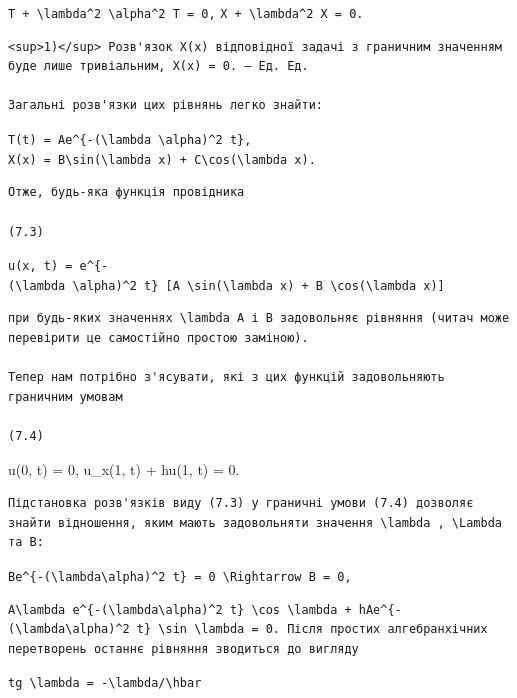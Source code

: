 \documentclass[
  ukrainian,
]{article}
\begin{document}
\texttt{T\textquotesingle{}\ +\ \textbackslash{}lambda\^{}2\ \textbackslash{}alpha\^{}2\ T\ =\ 0,}
\texttt{X\textquotesingle{}\ +\ \textbackslash{}lambda\^{}2\ X\ =\ 0.}

\begin{verbatim}
<sup>1)</sup> Розв'язок X(x) відповідної задачі з граничним значенням буде лише тривіальним, X(x) = 0. — Ед. Ед.

Загальні розв'язки цих рівнянь легко знайти:
\end{verbatim}

\texttt{T(t)\ =\ Ae\^{}\{-(\textbackslash{}lambda\ \textbackslash{}alpha)\^{}2\ t\},}
\texttt{X(x)\ =\ B\textbackslash{}sin(\textbackslash{}lambda\ x)\ +\ C\textbackslash{}cos(\textbackslash{}lambda\ x).}

\begin{verbatim}
Отже, будь-яка функція провідника

(7.3)
\end{verbatim}

\texttt{u(x,\ t)\ =\ e\^{}\{-(\textbackslash{}lambda\ \textbackslash{}alpha)\^{}2\ t\}\ {[}A\ \textbackslash{}sin(\textbackslash{}lambda\ x)\ +\ B\ \textbackslash{}cos(\textbackslash{}lambda\ x){]}}

\begin{verbatim}
при будь-яких значеннях \lambda A і B задовольняє рівняння (читач може перевірити це самостійно простою заміною).

Тепер нам потрібно з'ясувати, які з цих функцій задовольняють граничним умовам

(7.4)
\end{verbatim}

u(0, t) = 0, u\_x(1, t) + hu(1, t) = 0.

\begin{verbatim}
Підстановка розв'язків виду (7.3) у граничні умови (7.4) дозволяє знайти відношення, яким мають задовольняти значення \lambda , \Lambda та B:
\end{verbatim}

\texttt{Be\^{}\{-(\textbackslash{}lambda\textbackslash{}alpha)\^{}2\ t\}\ =\ 0\ \textbackslash{}Rightarrow\ B\ =\ 0,}

\begin{verbatim}
A\lambda e^{-(\lambda\alpha)^2 t} \cos \lambda + hAe^{-(\lambda\alpha)^2 t} \sin \lambda = 0. Після простих алгебранхічних перетворень останнє рівняння зводиться до вигляду
\end{verbatim}

\texttt{tg\ \textbackslash{}lambda\ =\ -\textbackslash{}lambda/\textbackslash{}hbar}
\end{document}

